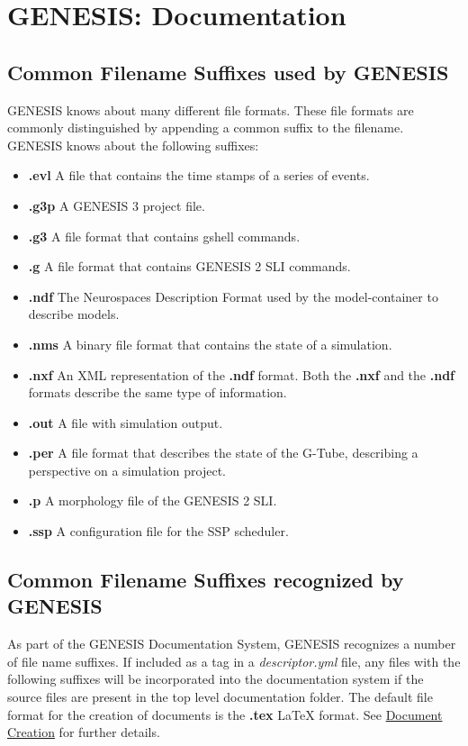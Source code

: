 \documentclass[12pt]{article}
\begin{document}
\section*{GENESIS: Documentation}

\subsection*{Common Filename Suffixes used by GENESIS}

GENESIS knows about many different file formats.  These file formats
are commonly distinguished by appending a common suffix to the
filename.  GENESIS knows about the following suffixes:

\begin{itemize}

\item[]{\bf .evl} A file that contains the time stamps of a series of events.
\item[]{\bf .g3p} A GENESIS 3 project file.
\item[]{\bf .g3} A file format that contains gshell commands.
\item[]{\bf .g} A file format that contains GENESIS 2 SLI commands.
\item[]{\bf .ndf} The Neurospaces Description Format used by the model-container to describe models.
\item[]{\bf .nms} A binary file format that contains the state of a simulation.
\item[]{\bf .nxf} An XML representation of the {\bf .ndf} format.  Both the {\bf .nxf} and the {\bf .ndf} formats describe the same type of information.
\item[]{\bf .out} A file with simulation output.
\item[]{\bf .per} A file format that describes the state of the G-Tube, describing a perspective on a simulation project.
\item[]{\bf .p} A morphology file of the GENESIS 2 SLI.
\item[]{\bf .ssp} A configuration file for the SSP scheduler.

\end{itemize}

\subsection*{Common Filename Suffixes recognized by GENESIS}
As part of the GENESIS Documentation System, GENESIS recognizes a number of file name suffixes. If included as a tag in a {\it descriptor.yml} file, any files with the following suffixes will be incorporated into the documentation system if the source files are present in the top level documentation folder. The default file format for the creation of documents is the {\bf .tex} \LaTeX\,\,format. See \href{../document-create/document-create.tex}{Document Creation} for further details.
\end{document}
